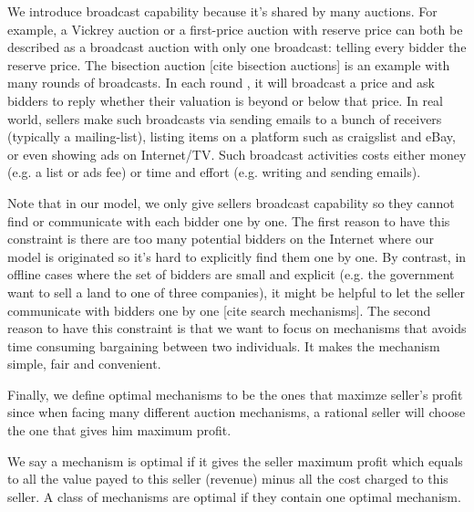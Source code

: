 We introduce broadcast capability because it's shared by many auctions.  For
example, a Vickrey auction or a first-price auction with reserve price can both be
described as a broadcast auction with only one broadcast: telling every bidder
the reserve price. The bisection auction [cite bisection auctions] is an
example with many rounds of broadcasts. In each round , it will broadcast
a price and ask bidders to reply whether their valuation is beyond or below that
price.  In real world, sellers make such broadcasts via sending emails to a
bunch of receivers (typically a mailing-list), listing items on a platform such
as craigslist and eBay, or even showing ads on Internet/TV. Such broadcast
activities costs either money (e.g. a list or ads fee) or time and effort (e.g.
writing and sending emails).

Note that in our model, we only give sellers broadcast capability so they
cannot find or communicate with each bidder one by one. The first reason to
have this constraint is there are too many potential bidders on the Internet
where our model is originated so it's hard to explicitly find
them one by one. By contrast, in offline cases where the set of bidders
are small and explicit (e.g. the government want to sell a land to one of three
companies), it might be helpful to let the seller communicate with bidders one
by one [cite search mechanisms]. The second reason to have this constraint is
that we want to focus on mechanisms that avoids time consuming bargaining
between two individuals. It makes the mechanism simple, fair and convenient.

Finally, we define optimal mechanisms to be the ones that maximze seller's
profit since when facing many different auction mechanisms, a rational seller
will choose the one that gives him maximum profit.

\begin{definition}

We say a mechanism is optimal if it gives the seller maximum profit
which equals to all the value payed to this seller (revenue) minus all the cost charged
to this seller. A class of mechanisms are optimal if they contain one optimal
mechanism.

\end{definition}
